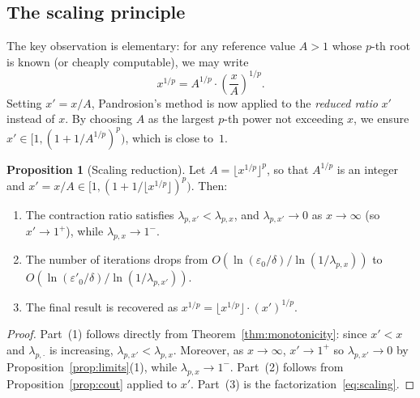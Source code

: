\documentclass[11pt,a4paper]{article}
\theoremstyle{definition}
\newtheorem{proposition}{Proposition}[section]
\newcommand{\eps}{\varepsilon}
\begin{document}
\subsection{The scaling principle}

The key observation is elementary: for any reference value $A > 1$ whose $p$-th root is known (or cheaply computable), we may write
\begin{equation}
  \label{eq:scaling}
  x^{1/p} = A^{1/p} \cdot \left(\frac{x}{A}\right)^{\!1/p}.
\end{equation}
Setting $x' = x/A$, Pandrosion's method is now applied to the \emph{reduced ratio} $x'$ instead of $x$. By choosing $A$ as the largest $p$-th power not exceeding $x$, we ensure $x' \in [1, (1+1/A^{1/p})^p)$, which is close to~$1$.

\begin{proposition}[Scaling reduction]
\label{prop:scaling}
Let $A = \lfloor x^{1/p} \rfloor^p$, so that $A^{1/p}$ is an integer and $x' = x/A \in [1, (1+1/\lfloor x^{1/p}\rfloor)^p)$. Then:
\begin{enumerate}
  \item The contraction ratio satisfies $\lambda_{p,x'} < \lambda_{p,x}$, and $\lambda_{p,x'} \to 0$ as $x \to \infty$ (so $x' \to 1^+$), while $\lambda_{p,x} \to 1^-$.
  \item The number of iterations drops from $O(\ln(\eps_0/\delta) / \ln(1/\lambda_{p,x}))$ to $O(\ln(\eps'_0/\delta) / \ln(1/\lambda_{p,x'}))$.
  \item The final result is recovered as $x^{1/p} = \lfloor x^{1/p} \rfloor \cdot (x')^{1/p}$.
\end{enumerate}
\end{proposition}

\begin{proof}
Part~(1) follows directly from Theorem~\ref{thm:monotonicity}: since $x' < x$ and $\lambda_{p,\cdot}$ is increasing, $\lambda_{p,x'} < \lambda_{p,x}$. Moreover, as $x \to \infty$, $x' \to 1^+$ so $\lambda_{p,x'} \to 0$ by Proposition~\ref{prop:limits}(1), while $\lambda_{p,x} \to 1^-$. Part~(2) follows from Proposition~\ref{prop:cout} applied to $x'$. Part~(3) is the factorization~\eqref{eq:scaling}.
\end{proof}
\end{document}
